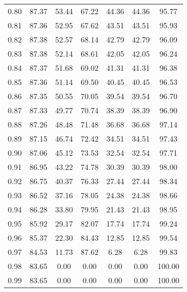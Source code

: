 \begin{tabular}{|c|c|c|c|c|c|c|}
      0.80 &     87.37 &     53.44 &      67.22 &   44.36 &      44.36 &         95.77 \\
      0.81 &     87.36 &     52.95 &      67.62 &   43.51 &      43.51 &         95.93 \\
      0.82 &     87.38 &     52.57 &      68.14 &   42.79 &      42.79 &         96.09 \\
      0.83 &     87.38 &     52.14 &      68.61 &   42.05 &      42.05 &         96.24 \\
      0.84 &     87.37 &     51.68 &      69.02 &   41.31 &      41.31 &         96.38 \\
      0.85 &     87.36 &     51.14 &      69.50 &   40.45 &      40.45 &         96.53 \\
      0.86 &     87.35 &     50.55 &      70.05 &   39.54 &      39.54 &         96.70 \\
      0.87 &     87.33 &     49.77 &      70.74 &   38.39 &      38.39 &         96.90 \\
      0.88 &     87.26 &     48.48 &      71.48 &   36.68 &      36.68 &         97.14 \\
      0.89 &     87.15 &     46.74 &      72.42 &   34.51 &      34.51 &         97.43 \\
      0.90 &     87.06 &     45.12 &      73.53 &   32.54 &      32.54 &         97.71 \\
      0.91 &     86.95 &     43.22 &      74.78 &   30.39 &      30.39 &         98.00 \\
      0.92 &     86.75 &     40.37 &      76.33 &   27.44 &      27.44 &         98.34 \\
      0.93 &     86.52 &     37.16 &      78.05 &   24.38 &      24.38 &         98.66 \\
      0.94 &     86.28 &     33.80 &      79.95 &   21.43 &      21.43 &         98.95 \\
      0.95 &     85.92 &     29.17 &      82.07 &   17.74 &      17.74 &         99.24 \\
      0.96 &     85.37 &     22.30 &      84.43 &   12.85 &      12.85 &         99.54 \\
      0.97 &     84.53 &     11.73 &      87.62 &    6.28 &       6.28 &         99.83 \\
      0.98 &     83.65 &      0.00 &       0.00 &    0.00 &       0.00 &        100.00 \\
      0.99 &     83.65 &      0.00 &       0.00 &    0.00 &       0.00 &        100.00 \\
\bottomrule
\end{tabular}
